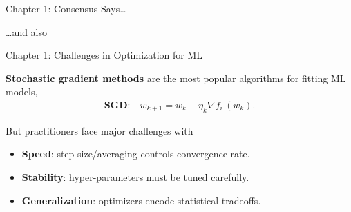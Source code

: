 \documentclass[mathserif,notheorems, hyperref={colorlinks, citecolor=blue, urlcolor=blue, linkcolor=blue}]{beamer}
\def\\{}%
\begin{document}
    \begin{frame}{Chapter 1: Consensus Says\ldots}

        \begin{center}
            \Large \dots and also~\citet{xu2017second,
            zhang2016parallel,
            patterson2017deep,
            pillaud2018statistical,
            grosse2015scaling,
            assran2018stochastic,
            damaskinos2019aggregathor,
            kawaguchi2020ordered,
            bernstein2018signsgd,
            li2019rsa,
            agarwal2017second,
            hofmann2015variance,
            geffner2019rule,
            assran2020convergence,
            gower2019sgd}
        \end{center}

    \end{frame}

    \begin{frame}{Chapter 1: Challenges in Optimization for ML}

        \textbf{Stochastic gradient methods} are the most popular algorithms for fitting ML models,
        \begin{align*}
            \textbf{SGD:} \quad w_{k + 1} = w_k - \eta_k \nabla f_i \, (w_k). \\
        \end{align*}


        But practitioners face major challenges with \vspace{0.5em}
        \begin{itemize}
            \item \textbf{Speed}: step-size/averaging controls convergence rate.
            \item \textbf{Stability}: hyper-parameters must be tuned carefully.
            \item \textbf{Generalization}: optimizers encode statistical tradeoffs.
        \end{itemize}
        \vspace{1em}

    \end{frame}
\end{document}
